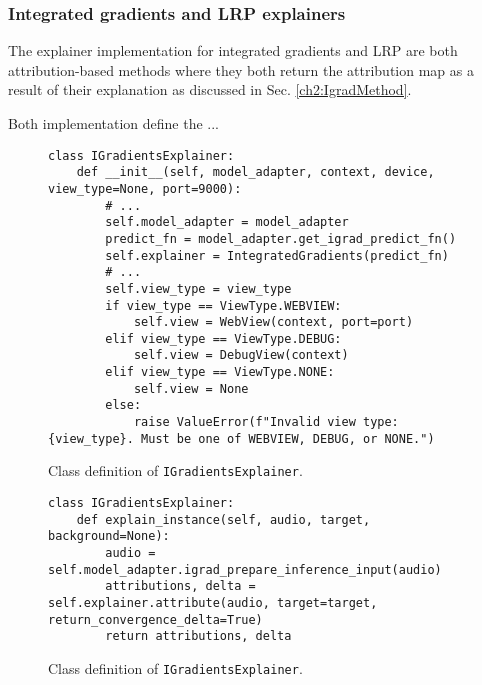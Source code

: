 \documentclass[
    bindingoffset=5mm,  %
    footnoteindent=3mm, %
    hyphenation=true    %
]{src/wut-thesis}
\begin{document}
\subsubsection{Integrated gradients and LRP explainers}

The explainer implementation for integrated gradients and LRP are both attribution-based methods
where they both return the attribution map as a result of their explanation as discussed in Sec. \ref{ch2:IgradMethod}.

Both implementation define the ...

\begin{figure}%
\begin{verbatim}
class IGradientsExplainer:
    def __init__(self, model_adapter, context, device, view_type=None, port=9000):
        # ...
        self.model_adapter = model_adapter
        predict_fn = model_adapter.get_igrad_predict_fn()
        self.explainer = IntegratedGradients(predict_fn)
        # ...
        self.view_type = view_type
        if view_type == ViewType.WEBVIEW:
            self.view = WebView(context, port=port)
        elif view_type == ViewType.DEBUG:
            self.view = DebugView(context)
        elif view_type == ViewType.NONE:
            self.view = None
        else:
            raise ValueError(f"Invalid view type: {view_type}. Must be one of WEBVIEW, DEBUG, or NONE.")
\end{verbatim}
\caption{Class definition of \texttt{IGradientsExplainer}.}
\label{fig:IGradientsExplainer}
\end{figure}

\begin{figure}%
\begin{verbatim}
class IGradientsExplainer:
    def explain_instance(self, audio, target, background=None):
        audio = self.model_adapter.igrad_prepare_inference_input(audio)
        attributions, delta = self.explainer.attribute(audio, target=target, return_convergence_delta=True)
        return attributions, delta
\end{verbatim}
\caption{Class definition of \texttt{IGradientsExplainer}.}
\label{fig:explain_instance}
\end{figure}
\end{document}
